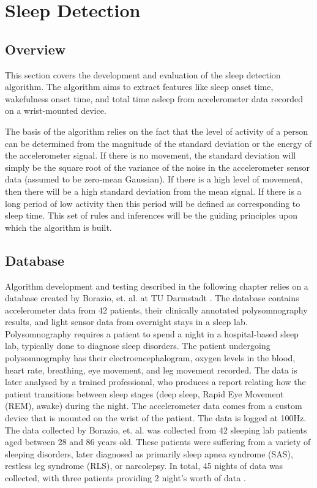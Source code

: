 \part{Sleep Detection}

    \chapter{Overview}

        This section covers the development and evaluation of the sleep detection algorithm. The algorithm aims to extract features like sleep onset time, wakefulness onset time, and total time asleep from accelerometer data recorded on a wrist-mounted device.

        The basis of the algorithm relies on the fact that the level of activity of a person can be determined from the magnitude of the standard deviation or the energy of the accelerometer signal. If there is no movement, the standard deviation will simply be the square root of the variance of the noise in the accelerometer sensor data (assumed to be zero-mean Gaussian). If there is a high level of movement, then there will be a high standard deviation from the mean signal. If there is a long period of low activity then this period will be defined as corresponding to sleep time. This set of rules and inferences will be the guiding principles upon which the algorithm is built.


    \chapter{Database}
        \label{c-database}

        Algorithm development and testing described in the following chapter relies on a database created by Borazio, et. al. at TU Darmstadt \cite{borazio}. The database contains accelerometer data from 42 patients, their clinically annotated polysomnography results, and light sensor data from overnight stays in a sleep lab. Polysomnography requires a patient to spend a night in a hospital-based sleep lab, typically done to diagnose sleep disorders. The patient undergoing polysomnography has their electroencephalogram, oxygen levels in the blood, heart rate, breathing, eye movement, and leg movement recorded. The data is later analysed by a trained professional, who produces a report relating how the patient transitions between sleep stages (deep sleep, Rapid Eye Movement (REM), awake) during the night. The accelerometer data comes from a custom device that is mounted on the wrist of the patient. The data is logged at 100Hz. The data collected by Borazio, et. al. was collected from 42 sleeping lab patients aged between 28 and 86 years old. These patients were suffering from a variety of sleeping disorders, later diagnosed as primarily sleep apnea syndrome (SAS), restless leg syndrome (RLS), or narcolepsy. In total, 45 nights of data was collected, with three patients providing 2 night's worth of data \cite{borazio}.

